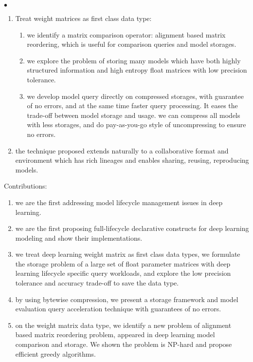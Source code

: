 \documentclass[conference]{IEEEtran}
\begin{document}
{\begin{list}{$\bullet$}{\leftmargin 0.15in \topsep 0pt \itemsep -3pt}
\begin{enumerate}
\begin{enumerate}
    \item we propose a VCS based system. use friendly query templates to capture the process in modeling lifecycle.
    \item we propose a DQL language, to help the user enumerate models, and encode model selection criteria. 
  \end{enumerate}
  \item Treat weight matrices as first class data type:
    \begin{enumerate}
      \item we identify a matrix comparison operator: alignment based matrix reordering, which is useful for comparison queries and model storages.
      \item we explore the problem of storing many models which have both highly structured information and high entropy float matrices with low precision tolerance. 
      \item we develop model query directly on compressed storages, with guarantee of no errors, and at the same time faster query processing.
      It eases the trade-off between model storage and usage. we can compress all models with less storages, and do pay-as-you-go style of uncompressing to ensure no errors.
    \end{enumerate}
  \item the technique proposed extends naturally to a collaborative format and environment which has rich lineages and enables sharing, reusing, reproducing models. 
\end{enumerate}
\item Contributions:
\begin{enumerate}
  \item we are the first addressing model lifecycle management issues in deep learning. 
  \item we are the first proposing full-lifecycle declarative constructs for deep learning modeling and show their implementations.
  \item we treat deep learning weight matrix as first class data types, we formulate the storage problem of a large set of float parameter matrices with deep learning lifecycle specific query workloads, and explore the low precision tolerance and accuracy trade-off to save the data type.
  \item by using bytewise compression, we present a storage framework and model evaluation query acceleration technique with guarantees of no errors.
  \item on the weight matrix data type, we identify a new problem of alignment based matrix reordering problem, appeared in deep learning model comparison and storage. We shown the problem is NP-hard and propose efficient greedy algorithms.

\end{enumerate}
\end{list}}
\end{document}
